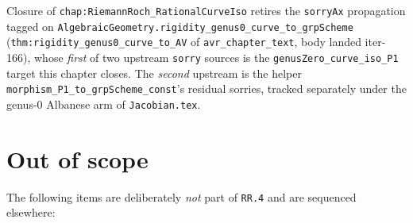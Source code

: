 \begin{remark}
  \label{rmk:rr4_unblocks_sorryAx_on_rigidity_genus0}
  Closure of \texttt{chap:RiemannRoch_RationalCurveIso} retires the
  \texttt{sorryAx} propagation tagged on
  \texttt{AlgebraicGeometry.rigidity\_genus0\_curve\_to\_grpScheme}
  (\texttt{thm:rigidity_genus0_curve_to_AV} of
  \texttt{avr_chapter_text}, body landed iter-166), whose
  \emph{first} of two upstream \texttt{sorry} sources is the
  \texttt{genusZero\_curve\_iso\_P1} target this chapter closes. The
  \emph{second} upstream is the helper
  \texttt{morphism\_P1\_to\_grpScheme\_const}'s residual sorries, tracked
  separately under the genus-\(0\) Albanese arm of \texttt{Jacobian.tex}.
\end{remark}
\section{Out of scope}
The following items are deliberately \emph{not} part of \texttt{RR.4} and
are sequenced elsewhere:
